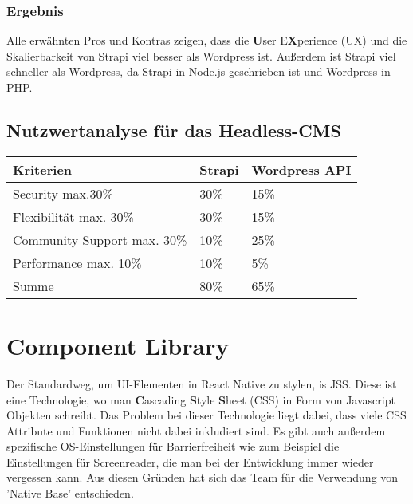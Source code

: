 \begin{spacing}{1}
    \subsubsection{Ergebnis}
    Alle erwähnten Pros und Kontras zeigen, dass  die \textbf{U}ser E\textbf{X}perience (UX)
    und die Skalierbarkeit von Strapi viel besser als Wordpress ist.
    Außerdem ist Strapi viel schneller als Wordpress,
    da Strapi in Node.js geschrieben ist und Wordpress in PHP.
    \cite{strapi-vs-wordpress}

    \subsection{Nutzwertanalyse für das Headless-CMS}

    \begin{tabular}{ |p{3cm}|p{3cm}|p{3cm}| }
        \hline
        Kriterien                   & Strapi & Wordpress API \\
        \hline
        Security max.30\%           & 30\%   & 15\%          \\
        \hline
        Flexibilität max. 30\%         & 30\%   & 15\%          \\
        \hline
        Community Support max. 30\% & 10\%   & 25\%          \\
        \hline
        Performance max. 10\%       & 10\%   & 5\%           \\
        \hline
        Summe                       & 80\%   & 65\%          \\
        \hline
    \end{tabular}


\end{spacing}

\section{Component Library}
Der Standardweg, um UI-Elementen in React Native zu stylen, is JSS. Diese ist eine Technologie, wo man \textbf{C}ascading \textbf{S}tyle \textbf{S}heet (CSS)
in Form von Javascript Objekten schreibt. Das Problem bei dieser Technologie liegt dabei,
dass viele CSS Attribute und Funktionen nicht dabei inkludiert sind. Es gibt auch außerdem spezifische OS-Einstellungen für Barrierfreiheit wie zum Beispiel die Einstellungen für Screenreader,
die man bei der Entwicklung immer wieder vergessen kann.
Aus diesen Gründen hat sich das Team für die Verwendung von 'Native Base' entschieden.

